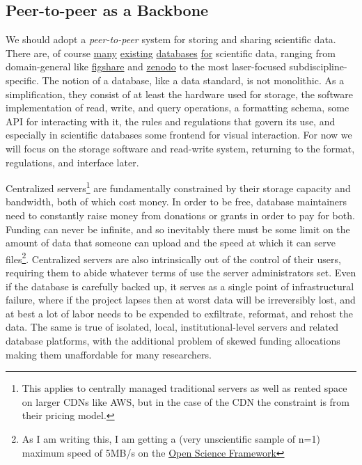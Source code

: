 \hypertarget{peer-to-peer-as-a-backbone}{%
\subsection{Peer-to-peer as a
Backbone}\label{peer-to-peer-as-a-backbone}}

We should adopt a \emph{peer-to-peer} system for storing and sharing
scientific data. There are, of course
\href{https://www.dandiarchive.org/}{many}
\href{https://openneuro.org/}{existing}
\href{https://www.brainminds.riken.jp/}{databases}
\href{https://biccn.org/}{for} scientific data, ranging from
domain-general like \href{https://figshare.com/}{figshare} and
\href{https://zenodo.org/}{zenodo} to the most laser-focused
subdiscipline-specific. The notion of a database, like a data standard,
is not monolithic. As a simplification, they consist of at least the
hardware used for storage, the software implementation of read, write,
and query operations, a formatting schema, some API for interacting with
it, the rules and regulations that govern its use, and especially in
scientific databases some frontend for visual interaction. For now we
will focus on the storage software and read-write system, returning to
the format, regulations, and interface later.

Centralized servers\footnote{This applies to centrally managed
  traditional servers as well as rented space on larger CDNs like AWS,
  but in the case of the CDN the constraint is from their pricing model.}
are fundamentally constrained by their storage capacity and bandwidth,
both of which cost money. In order to be free, database maintainers need
to constantly raise money from donations or grants in order to pay for
both. Funding can never be infinite, and so inevitably there must be
some limit on the amount of data that someone can upload and the speed
at which it can serve files\footnote{As I am writing this, I am getting
  a (very unscientific sample of n=1) maximum speed of 5MB/s on the
  \href{https://osf.io}{Open Science Framework}}. Centralized servers
are also intrinsically out of the control of their users, requiring them
to abide whatever terms of use the server administrators set. Even if
the database is carefully backed up, it serves as a single point of
infrastructural failure, where if the project lapses then at worst data
will be irreversibly lost, and at best a lot of labor needs to be
expended to exfiltrate, reformat, and rehost the data. The same is true
of isolated, local, institutional-level servers and related database
platforms, with the additional problem of skewed funding allocations
making them unaffordable for many researchers.

